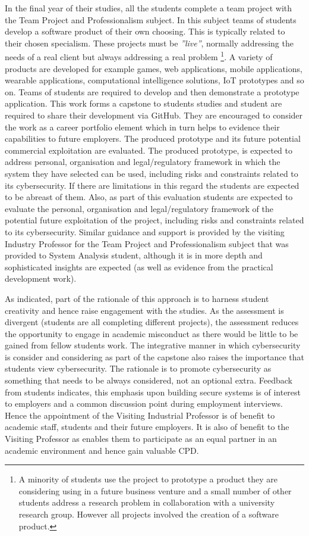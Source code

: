\documentclass[conference]{IEEEtran}
\begin{document}
In the final year of their studies, all the students complete a team project with the Team Project and Professionalism subject. In this subject teams of students develop a software product of their own choosing. This is typically related to their chosen specialism. These projects must be {\em''live''}, normally addressing the needs of a real client but always addressing a real problem \footnote{A minority of students use the project to prototype a product they are considering using in a future business venture and a small number of other students address a research problem in collaboration with a university research group. However all projects involved the creation of a software product.}. A variety of products are developed for example games, web applications, mobile applications, wearable applications, computational intelligence solutions, IoT prototypes and so on. Teams of students are required to develop and then demonstrate a prototype application. This work forms a capstone to students studies and student are required to share their development via GitHub. They are encouraged to consider the work as a career portfolio element which in turn helps to evidence their capabilities to future employers. The produced prototype and its future potential commercial exploitation are evaluated. The produced prototype, is expected to address personal, organisation and legal/regulatory framework in which the system they have selected can be used, including risks and constraints related to its cybersecurity. If there are limitations in this regard the students are expected to be abreast of them. Also, as part of this evaluation students are expected to evaluate the personal, organisation and legal/regulatory framework of the potential future exploitation of the project, including risks and constraints related to its cybersecurity. Similar guidance and support is provided by the visiting Industry Professor for the Team Project and Professionalism subject that was provided to System Analysis student, although it is in more depth and  sophisticated insights are expected (as well as evidence from the practical development work).  

As indicated, part of the rationale of this approach is to harness student creativity and hence raise engagement with the studies. As the assessment is divergent {\cite{Bradley2016}} (students are all completing different projects), the assessment reduces the opportunity to engage in academic misconduct as there would be little to be gained from fellow students work. The integrative manner in which cybersecurity is consider and considering as part of the capstone also raises the importance that students view cybersecurity. The rationale is to promote cybersecurity as something that needs to be always considered, not an optional extra. Feedback from students indicates, this emphasis upon building secure systems is of interest to employers and a common discussion point during employment interviews. Hence the appointment of the Visiting Industrial Professor is of benefit to academic staff, students and their future employers. It is also of benefit to the Visiting Professor as enables them to participate as an equal partner in an academic environment and hence gain valuable CPD.
\end{document}
